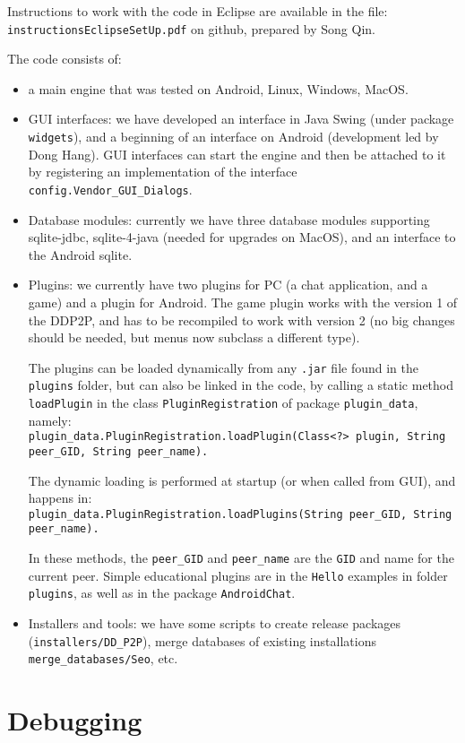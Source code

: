 \documentclass{book}
\begin{document}
Instructions to work with the code in Eclipse are available in the file: {\tt instructionsEclipseSetUp.pdf} on github, prepared by Song Qin.

The code consists of:
\begin{itemize}
\item a main engine that was tested on Android, Linux, Windows, MacOS.
\item GUI interfaces: we have developed an interface in Java Swing (under package {\tt widgets}), and a beginning of an interface on Android (development led by Dong Hang). GUI interfaces can start the engine and then be attached to it by registering an implementation of the interface {\tt config.Vendor\_GUI\_Dialogs}.
\item Database modules: currently we have three database modules supporting sqlite-jdbc, sqlite-4-java (needed for upgrades on MacOS), and an interface to the Android sqlite.
\item Plugins: we currently have two plugins for PC (a chat application, and a game) and a plugin for Android. The game plugin works with the version 1 of the DDP2P, and has to be recompiled to work with version 2 (no big changes should be needed, but menus now subclass a different type).
 
The plugins can be loaded dynamically from any {\tt .jar} file found in the {\tt plugins} folder, but can also be linked in the code, by calling a static method {\tt loadPlugin} 
in the class {\tt PluginRegistration} of package {\tt plugin\_data}, namely:\\
 {\tt plugin\_data.PluginRegistration.loadPlugin(Class<?> plugin, String peer\_GID, String peer\_name).}

The dynamic loading is performed at startup (or when called from GUI), and happens in:\\
 {\tt plugin\_data.PluginRegistration.loadPlugins(String peer\_GID, String peer\_name).}

In these methods, the {\tt peer\_GID} and {\tt peer\_name} are the {\tt GID} and name for the current peer.
Simple educational plugins are in the {\tt Hello} examples in folder {\tt plugins}, as well as in the package {\tt AndroidChat}. 
\item Installers and tools: we have some scripts to create release packages ({\tt installers/DD\_P2P}), merge databases of existing installations {\tt merge\_databases/Seo}, etc.
\end{itemize}

\section{Debugging}
\end{document}
